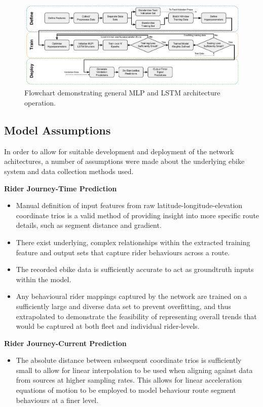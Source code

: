 \documentclass[a4paper, 10pt]{article}
\numberwithin{equation}{section}
\begin{document}
\begin{figure}[h!]
    \centering
    \includegraphics[width=\textwidth]{images/NN_Generic/MLP_structure.pdf}
    \caption{Flowchart demonstrating general MLP and LSTM architecture operation.}
    \label{fig:my_label}
\end{figure}


\subsection{Model Assumptions}
In order to allow for suitable development and deployment of the network achitectures, a number of assumptions were made about the underlying ebike system and data collection methods used.

\vspace{0.5em}
\textbf{Rider Journey-Time Prediction}
\begin{itemize}
    \item Manual definition of input features from raw latitude-longitude-elevation coordinate trios is a valid method of providing insight into more specific route details, such as segment distance and gradient.
    \item There exist underlying, complex relationships within the extracted training feature and output sets that capture rider behaviours across a route.
    \item The recorded ebike data is sufficiently accurate to act as groundtruth inputs within the model.
    \item Any behavioural rider mappings captured by the network are trained on a sufficiently large and diverse data set to prevent overfitting, and thus extrapolated to demonstrate the feasibility of representing overall trends that would be captured at both fleet and individual rider-levels.
\end{itemize}

\textbf{Rider Journey-Current Prediction}
\begin{itemize}
    \item The absolute distance between subsequent coordinate trios is sufficiently small to allow for linear interpolation to be used when aligning against data from sources at higher sampling rates. This allows for linear acceleration equations of motion to be employed to model behaviour route segment behaviours at a finer level.
\end{itemize}
\end{document}
